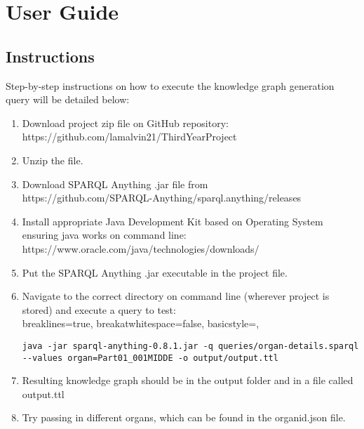 \chapter{User Guide}
\section{Instructions}
Step-by-step instructions on how to execute the knowledge graph generation query will be detailed below:

\begin{enumerate}
    \item Download project zip file on GitHub repository: \\ https://github.com/lamalvin21/ThirdYearProject
    \item Unzip the file.
    \item Download SPARQL Anything .jar file from \\ https://github.com/SPARQL-Anything/sparql.anything/releases
    \item Install appropriate Java Development Kit based on Operating System ensuring java works on command line: \\ https://www.oracle.com/java/technologies/downloads/
    \item Put the SPARQL Anything .jar executable in the project file.
    \item Navigate to the correct directory on command line (wherever project is stored) and execute a query to test: \\ 
\vspace{-0.4cm}
\lstset
{
    breaklines=true,
    breakatwhitespace=false,
    basicstyle=\linespread{1}\ttfamily,
}
\begin{lstlisting}
java -jar sparql-anything-0.8.1.jar -q queries/organ-details.sparql --values organ=Part01_001MIDDE -o output/output.ttl
\end{lstlisting}
\vspace{-0.25cm}
    \item Resulting knowledge graph should be in the output folder and in a file called output.ttl
    \item Try passing in different organs, which can be found in the organid.json file.
\end{enumerate}

